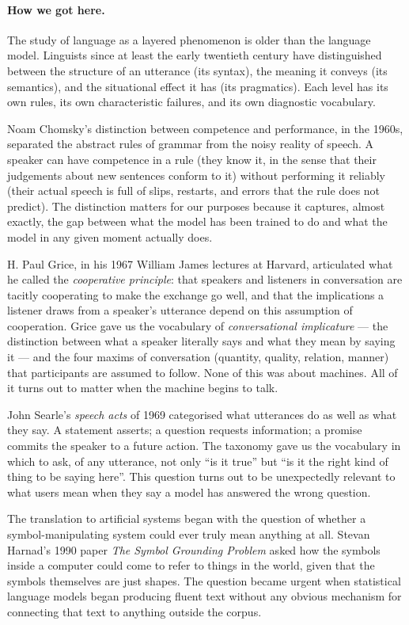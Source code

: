 \paragraph{How we got here.} The study of language as a layered phenomenon is older than
the language model. Linguists since at least the early
twentieth century have distinguished between the structure of
an utterance (its syntax), the meaning it conveys (its
semantics), and the situational effect it has (its
pragmatics). Each level has its own rules, its own
characteristic failures, and its own diagnostic vocabulary.

Noam Chomsky's distinction between competence and performance,
in the 1960s, separated the abstract rules of grammar from
the noisy reality of speech. A speaker can have competence in
a rule (they know it, in the sense that their judgements
about new sentences conform to it) without performing it
reliably (their actual speech is full of slips, restarts, and
errors that the rule does not predict). The distinction
matters for our purposes because it captures, almost
exactly, the gap between what the model has been trained to
do and what the model in any given moment actually does.

H. Paul Grice, in his 1967 William James lectures at Harvard,
articulated what he called the \emph{cooperative principle}:
that speakers and listeners in conversation are tacitly
cooperating to make the exchange go well, and that the
implications a listener draws from a speaker's utterance
depend on this assumption of cooperation. Grice gave us the
vocabulary of \emph{conversational implicature} --- the
distinction between what a speaker literally says and what
they mean by saying it --- and the four maxims of conversation
(quantity, quality, relation, manner) that participants are
assumed to follow. None of this was about machines. All of it
turns out to matter when the machine begins to talk.

John Searle's \emph{speech acts} of 1969 categorised what
utterances do as well as what they say. A statement asserts; a
question requests information; a promise commits the speaker
to a future action. The taxonomy gave us the vocabulary in
which to ask, of any utterance, not only ``is it true'' but
``is it the right kind of thing to be saying here''. This
question turns out to be unexpectedly relevant to what users
mean when they say a model has answered the wrong question.

The translation to artificial systems began with the question
of whether a symbol-manipulating system could ever truly mean
anything at all. Stevan Harnad's 1990 paper \emph{The Symbol
Grounding Problem} asked how the symbols inside a computer
could come to refer to things in the world, given that the
symbols themselves are just shapes. The question became
urgent when statistical language models began producing
fluent text without any obvious mechanism for connecting that
text to anything outside the corpus.

